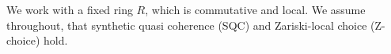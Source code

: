 
We work with a fixed ring $R$, which is commutative and local.
We assume throughout, that synthetic quasi coherence (SQC) and Zariski-local choice (Z-choice) hold.
